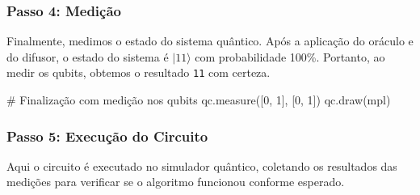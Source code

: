\documentclass[
  brazilian,
]{report}
\newenvironment{Shaded}{\begin{snugshade}}{\end{snugshade}}
\newcommand{\NormalTok}[1]{\textcolor[rgb]{0.00,0.23,0.31}{#1}}
\begin{document}
\subsubsection{Passo 4: Medição}\label{passo-4-mediuxe7uxe3o}

Finalmente, medimos o estado do sistema quântico. Após a aplicação do
oráculo e do difusor, o estado do sistema é \(|11\rangle\) com
probabilidade 100\%. Portanto, ao medir os qubits, obtemos o resultado
\texttt{11} com certeza.

\begin{Shaded}
\begin{Highlighting}[]

\NormalTok{\# Finalização com medição nos qubits}
\NormalTok{qc.measure([0, 1], [0, 1])}
\NormalTok{qc.draw(\textquotesingle{}mpl\textquotesingle{})}
\end{Highlighting}
\end{Shaded}

\subsubsection{Passo 5: Execução do
Circuito}\label{passo-5-execuuxe7uxe3o-do-circuito}

Aqui o circuito é executado no simulador quântico, coletando os
resultados das medições para verificar se o algoritmo funcionou conforme
esperado.
\end{document}
